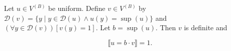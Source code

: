 Let $u \in V^{(B)}$ be uniform. Define $v \in V^{(B)}$ by $\mathcal{D}(v) = \{y \mid y \in \mathcal{D}(u) \land u(y) = \sup(u)\}$ and $(\forall y \in \mathcal{D}(v))[v(y) = 1]$. Let $b = \sup(u)$. Then $v$ is definite and

$$\llbracket u = b \cdot v \rrbracket = 1.$$
